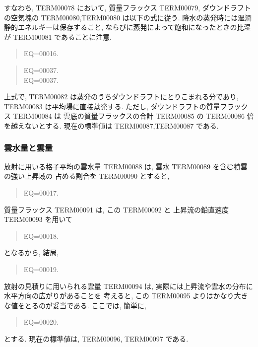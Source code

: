 すなわち, TERM00078 において, 質量フラックス TERM00079, 
ダウンドラフトの空気塊の TERM00080,TERM00080 は以下の式に従う.
降水の蒸発時には湿潤静的エネルギーは保存すること,
ならびに蒸発によって飽和になったときの比湿が
TERM00081 であることに注意. 
\begin{quote}
EQ=00016.
\end{quote}
\begin{quote}
EQ=00037.\\
EQ=00037.
\end{quote}

上式で, TERM00082 は蒸発のうちダウンドラフトにとりこまれる分であり,
TERM00083 は平均場に直接蒸発する. 
ただし, ダウンドラフトの質量フラックス TERM00084 は
雲底の質量フラックスの合計 TERM00085 の TERM00086 倍を越えないとする.
現在の標準値は TERM00087,TERM00087 である.

\subsubsection{雲水量と雲量}

放射に用いる格子平均の雲水量 TERM00088 は, 
雲水 TERM00089 を含む積雲の強い上昇域の
占める割合を TERM00090 とすると,
\begin{quote}
EQ=00017.
\end{quote}
質量フラックス TERM00091 は, この TERM00092 と
上昇流の鉛直速度 TERM00093 を用いて
\begin{quote}
EQ=00018.
\end{quote}
となるから, 結局,
\begin{quote}
EQ=00019.
\end{quote}

放射の見積りに用いられる雲量 TERM00094  は, 
実際には上昇流や雲水の分布に水平方向の広がりがあることを
考えると, この TERM00095  よりはかなり大きな値をとるのが妥当である.
ここでは, 簡単に, 
\begin{quote}
EQ=00020.
\end{quote}
とする.
現在の標準値は, TERM00096, TERM00097 である.
